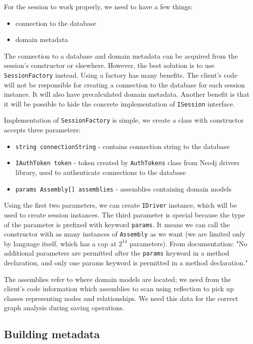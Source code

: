 For the session to work properly, we need to have a few things:

\begin{itemize}
    \item connection to the database
    \item domain metadata
\end{itemize}

The connection to a database and domain metadata can be acquired from the session's constructor or elsewhere. However,
the best solution is to use \texttt{SessionFactory} instead. Using a factory has many benefits. The client's code will not be responsible for
creating a connection to the database for each session instance. It will also have precalculated domain metadata. Another benefit is
that it will be possible to hide the concrete implementation of \texttt{ISession} interface.

Implementation of \texttt{SessionFactory} is simple, we create a class with constructor accepts three parameters:
\begin{itemize}
    \item {\texttt{string connectionString} - contains connection string to the database}
    \item {\texttt{IAuthToken token} - token created by \texttt{AuthTokens} class from Neo4j drivers library, used to authenticate connections to the database}
    \item {\texttt{params Assembly[] assemblies} - assemblies containing domain models}
\end{itemize}
Using the first two parameters, we can create \texttt{IDriver} instance, which will be used to create session instances. The third parameter is special
because the type of the parameter is prefixed with keyword \texttt{params}. It means we can call the constructor with as many instances of \texttt{Assembly} as we want
(we are limited only by language itself, which has a cap at $2^{14}$ parameters). From \CS documentation:
"No additional parameters are permitted after the \texttt{params} keyword in a method declaration, and only one params keyword is permitted in a method declaration." \cite{billwagner_params_nodate}

The assemblies refer to where domain models are located; we need from the client's code information which assemblies to scan using reflection to pick up classes
representing nodes and relationships. We need this data for the correct graph analysis during saving operations.

\subsection {Building metadata}


